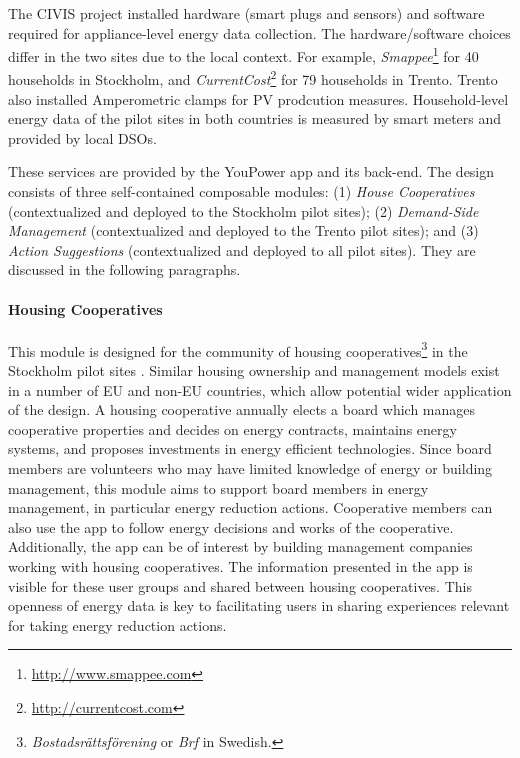  The CIVIS project installed hardware (smart plugs and sensors) and
software required for appliance-level energy data collection. The hardware/software choices differ in the
two sites due to the local context. For example, \textit{Smappee}\footnote{\url{http://www.smappee.com}}
for 40 households in Stockholm, and \textit{CurrentCost}\footnote{\url{http://currentcost.com}} for 79
households in Trento. Trento also installed Amperometric clamps for PV prodcution measures. 
Household-level energy data of the pilot sites in both countries is measured by smart meters and provided by local DSOs. 

 These services are provided by the YouPower
app and its back-end. The design consists of three self-contained
composable modules: (1) \textit{House Cooperatives} (contextualized and deployed to the Stockholm pilot sites);
(2) \textit{Demand-Side Management} (contextualized and deployed
to the Trento pilot sites); and (3) \textit{Action Suggestions} (contextualized and deployed to all pilot sites).
They are discussed in the following paragraphs. 

\paragraph{Housing Cooperatives}
\label{sect:brf}

This module is designed for the community of housing cooperatives\footnote{\textit{Bostadsr{\"a}ttsf{\"o}rening} or \textit{Brf} in Swedish.} in the Stockholm pilot sites \cite{Hasselqvist2016}.
Similar housing ownership and management models exist in a number of EU and non-EU countries, which allow potential wider application of the design.
A housing cooperative annually elects a board which manages cooperative properties and decides on energy contracts, maintains energy systems, and proposes investments in energy efficient technologies. Since board members are volunteers who may have limited knowledge of energy or building management, this module aims to support board members in energy management, in particular energy reduction actions. Cooperative members can also use the app to follow energy decisions and works of the cooperative. Additionally, the app can be of interest by building management companies working with housing cooperatives. 
The information presented in the app is visible for these user
groups and shared between housing cooperatives. This openness of energy data is key to
facilitating  users in sharing experiences relevant for taking energy reduction actions.

